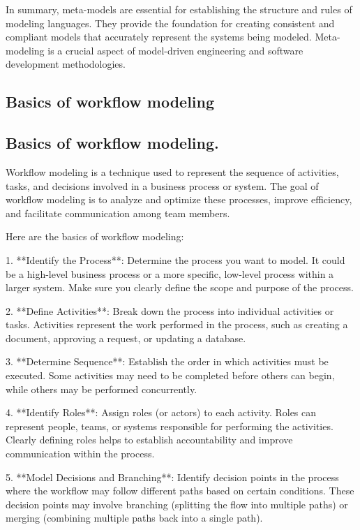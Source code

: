 \documentclass{article}
\begin{document}
In summary, meta-models are essential for establishing the structure and rules of modeling languages. They provide the foundation for creating consistent and compliant models that accurately represent the systems being modeled. Meta-modeling is a crucial aspect of model-driven engineering and software development methodologies.


\subsection{Basics of workflow modeling}
\subsection{Basics of workflow modeling.}

Workflow modeling is a technique used to represent the sequence of activities, tasks, and decisions involved in a business process or system. The goal of workflow modeling is to analyze and optimize these processes, improve efficiency, and facilitate communication among team members.

Here are the basics of workflow modeling:

1. **Identify the Process**: Determine the process you want to model. It could be a high-level business process or a more specific, low-level process within a larger system. Make sure you clearly define the scope and purpose of the process.

2. **Define Activities**: Break down the process into individual activities or tasks. Activities represent the work performed in the process, such as creating a document, approving a request, or updating a database.

3. **Determine Sequence**: Establish the order in which activities must be executed. Some activities may need to be completed before others can begin, while others may be performed concurrently.

4. **Identify Roles**: Assign roles (or actors) to each activity. Roles can represent people, teams, or systems responsible for performing the activities. Clearly defining roles helps to establish accountability and improve communication within the process.

5. **Model Decisions and Branching**: Identify decision points in the process where the workflow may follow different paths based on certain conditions. These decision points may involve branching (splitting the flow into multiple paths) or merging (combining multiple paths back into a single path).
\end{document}
